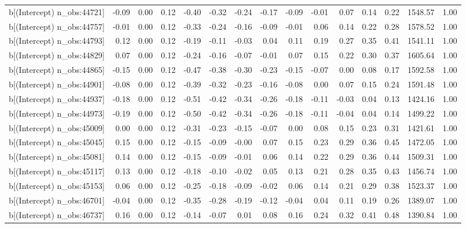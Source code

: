 \begin{table}[ht]
\begin{tabular}{rrrrrrrrrrrrrrr}
  b[(Intercept) n\_obs:44721] & -0.09 & 0.00 & 0.12 & -0.40 & -0.32 & -0.24 & -0.17 & -0.09 & -0.01 & 0.07 & 0.14 & 0.22 & 1548.57 & 1.00 \\ 
  b[(Intercept) n\_obs:44757] & -0.01 & 0.00 & 0.12 & -0.33 & -0.24 & -0.16 & -0.09 & -0.01 & 0.06 & 0.14 & 0.22 & 0.28 & 1578.52 & 1.00 \\ 
  b[(Intercept) n\_obs:44793] & 0.12 & 0.00 & 0.12 & -0.19 & -0.11 & -0.03 & 0.04 & 0.11 & 0.19 & 0.27 & 0.35 & 0.41 & 1541.11 & 1.00 \\ 
  b[(Intercept) n\_obs:44829] & 0.07 & 0.00 & 0.12 & -0.24 & -0.16 & -0.07 & -0.01 & 0.07 & 0.15 & 0.22 & 0.30 & 0.37 & 1605.64 & 1.00 \\ 
  b[(Intercept) n\_obs:44865] & -0.15 & 0.00 & 0.12 & -0.47 & -0.38 & -0.30 & -0.23 & -0.15 & -0.07 & 0.00 & 0.08 & 0.17 & 1592.58 & 1.00 \\ 
  b[(Intercept) n\_obs:44901] & -0.08 & 0.00 & 0.12 & -0.39 & -0.32 & -0.23 & -0.16 & -0.08 & 0.00 & 0.07 & 0.15 & 0.24 & 1591.48 & 1.00 \\ 
  b[(Intercept) n\_obs:44937] & -0.18 & 0.00 & 0.12 & -0.51 & -0.42 & -0.34 & -0.26 & -0.18 & -0.11 & -0.03 & 0.04 & 0.13 & 1424.16 & 1.00 \\ 
  b[(Intercept) n\_obs:44973] & -0.19 & 0.00 & 0.12 & -0.50 & -0.42 & -0.34 & -0.26 & -0.18 & -0.11 & -0.04 & 0.04 & 0.14 & 1499.22 & 1.00 \\ 
  b[(Intercept) n\_obs:45009] & 0.00 & 0.00 & 0.12 & -0.31 & -0.23 & -0.15 & -0.07 & 0.00 & 0.08 & 0.15 & 0.23 & 0.31 & 1421.61 & 1.00 \\ 
  b[(Intercept) n\_obs:45045] & 0.15 & 0.00 & 0.12 & -0.15 & -0.09 & -0.00 & 0.07 & 0.15 & 0.23 & 0.29 & 0.36 & 0.45 & 1472.05 & 1.00 \\ 
  b[(Intercept) n\_obs:45081] & 0.14 & 0.00 & 0.12 & -0.15 & -0.09 & -0.01 & 0.06 & 0.14 & 0.22 & 0.29 & 0.36 & 0.44 & 1509.31 & 1.00 \\ 
  b[(Intercept) n\_obs:45117] & 0.13 & 0.00 & 0.12 & -0.18 & -0.10 & -0.02 & 0.05 & 0.13 & 0.21 & 0.28 & 0.35 & 0.43 & 1456.74 & 1.00 \\ 
  b[(Intercept) n\_obs:45153] & 0.06 & 0.00 & 0.12 & -0.25 & -0.18 & -0.09 & -0.02 & 0.06 & 0.14 & 0.21 & 0.29 & 0.38 & 1523.37 & 1.00 \\ 
  b[(Intercept) n\_obs:46701] & -0.04 & 0.00 & 0.12 & -0.35 & -0.28 & -0.19 & -0.12 & -0.04 & 0.04 & 0.11 & 0.19 & 0.26 & 1389.07 & 1.00 \\ 
  b[(Intercept) n\_obs:46737] & 0.16 & 0.00 & 0.12 & -0.14 & -0.07 & 0.01 & 0.08 & 0.16 & 0.24 & 0.32 & 0.41 & 0.48 & 1390.84 & 1.00 \\ 

\end{tabular}
\end{table}
